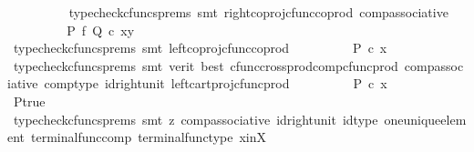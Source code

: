 \begin{isabellebody}
\ \ \ \ \ \ \ \ \isamarkupfalse%
\ {\isacharparenleft}{\kern0pt}typecheck{\isacharunderscore}{\kern0pt}cfuncs{\isacharunderscore}{\kern0pt}prems{\isacharcomma}{\kern0pt}\ smt\ right{\isacharunderscore}{\kern0pt}coproj{\isacharunderscore}{\kern0pt}cfunc{\isacharunderscore}{\kern0pt}coprod\ comp{\isacharunderscore}{\kern0pt}associative{}{\isacharparenright}{\kern0pt}\isanewline
\ \ \ \ \ \ \isamarkupfalse%
\ \isamarkupfalse%
\ {\isachardoublequoteopen}{\isacharparenleft}{\kern0pt}P\ {\isasymtimes}\isactrlsub f\ Q{\isacharparenright}{\kern0pt}\ {\isasymcirc}\isactrlsub c\ {\isasymlangle}x{\isacharcomma}{\kern0pt}y{\isasymrangle}\ {\isacharequal}{\kern0pt}\ {\isasymlangle}{\isasymf}{\isacharcomma}{\kern0pt}{\isasymf}{\isasymrangle}{\isachardoublequoteclose}\isanewline
\ \ \ \ \ \ \ \ \isamarkupfalse%
\ {\isacharparenleft}{\kern0pt}typecheck{\isacharunderscore}{\kern0pt}cfuncs{\isacharunderscore}{\kern0pt}prems{\isacharcomma}{\kern0pt}\ smt\ left{\isacharunderscore}{\kern0pt}coproj{\isacharunderscore}{\kern0pt}cfunc{\isacharunderscore}{\kern0pt}coprod{\isacharparenright}{\kern0pt}\isanewline
\ \ \ \ \ \ \isamarkupfalse%
\ \isamarkupfalse%
\ {\isachardoublequoteopen}P\ {\isasymcirc}\isactrlsub c\ x\ {\isacharequal}{\kern0pt}\ {\isasymf}{\isachardoublequoteclose}\isanewline
\ \ \ \ \ \ \ \ \isamarkupfalse%
\ {\isacharparenleft}{\kern0pt}typecheck{\isacharunderscore}{\kern0pt}cfuncs{\isacharunderscore}{\kern0pt}prems{\isacharcomma}{\kern0pt}\ smt\ {\isacharparenleft}{\kern0pt}verit{\isacharcomma}{\kern0pt}\ best{\isacharparenright}{\kern0pt}\ cfunc{\isacharunderscore}{\kern0pt}cross{\isacharunderscore}{\kern0pt}prod{\isacharunderscore}{\kern0pt}comp{\isacharunderscore}{\kern0pt}cfunc{\isacharunderscore}{\kern0pt}prod\ comp{\isacharunderscore}{\kern0pt}associative{}\ comp{\isacharunderscore}{\kern0pt}type\ id{\isacharunderscore}{\kern0pt}right{\isacharunderscore}{\kern0pt}unit{}\ left{\isacharunderscore}{\kern0pt}cart{\isacharunderscore}{\kern0pt}proj{\isacharunderscore}{\kern0pt}cfunc{\isacharunderscore}{\kern0pt}prod{\isacharparenright}{\kern0pt}\isanewline
\ \ \ \ \ \ \isamarkupfalse%
\ \isamarkupfalse%
\ {\isachardoublequoteopen}P\ {\isasymcirc}\isactrlsub c\ x\ {\isacharequal}{\kern0pt}\ {\isasymt}{\isachardoublequoteclose}\isanewline
\ \ \ \ \ \ \ \ \isamarkupfalse%
\ P{\isacharunderscore}{\kern0pt}true\ \isamarkupfalse%
\ {\isacharparenleft}{\kern0pt}typecheck{\isacharunderscore}{\kern0pt}cfuncs{\isacharunderscore}{\kern0pt}prems{\isacharcomma}{\kern0pt}\ smt\ {\isacharparenleft}{\kern0pt}z{}{\isacharparenright}{\kern0pt}\ comp{\isacharunderscore}{\kern0pt}associative{}\ id{\isacharunderscore}{\kern0pt}right{\isacharunderscore}{\kern0pt}unit{}\ id{\isacharunderscore}{\kern0pt}type\ one{\isacharunderscore}{\kern0pt}unique{\isacharunderscore}{\kern0pt}element\ terminal{\isacharunderscore}{\kern0pt}func{\isacharunderscore}{\kern0pt}comp\ terminal{\isacharunderscore}{\kern0pt}func{\isacharunderscore}{\kern0pt}type\ x{\isacharunderscore}{\kern0pt}in{\isacharunderscore}{\kern0pt}X{\isacharparenright}{\kern0pt}\isanewline

\end{isabellebody}
